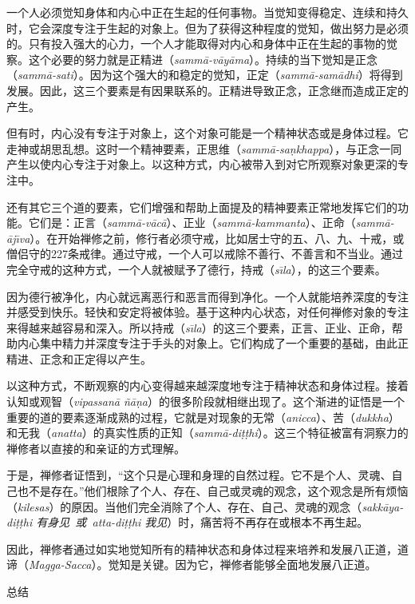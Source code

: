 一个人必须觉知身体和内心中正在生起的任何事物。当觉知变得稳定、连续和持久时，它会深度专注于生起的对象上。但为了获得这种程度的觉知，做出努力是必须的。只有投入强大的心力，一个人才能取得对内心和身体中正在生起的事物的觉察。这个必要的努力就是正精进（{\it samm\=a-v\=ay\=ama}）。持续的当下觉知是正念（{\it samm\=a-sati}）。因为这个强大的和稳定的觉知，正定（{\it samm\=a-sam\=adhi}）将得到发展。因此，这三个要素是有因果联系的。正精进导致正念，正念继而造成正定的产生。

但有时，内心没有专注于对象上，这个对象可能是一个精神状态或是身体过程。它走神或胡思乱想。这时一个精神要素，正思维（{\it samm\=a-sa\d nkhappa}），与正念一同产生以使内心专注于对象上。以这种方式，内心被带入到对它所观察对象更深的专注中。

还有其它三个道的要素，它们增强和帮助上面提及的精神要素正常地发挥它们的功能。它们是：正言（{\it samm\=a-v\=ac\=a}）、正\1业（{\it samm\=a-kammanta}）、正命（{\it samm\=a-\=aj\=\i va}）。在开始禅修之前，修行者必须守戒，比如居士守的五、八、九、十戒，或僧侣守的227条戒律。通过守戒，一个人可以戒除不善行、不善言和不当业。通过完全守戒的这种方式，一个人就被赋予了德行，持戒（{\it s\=\i la}），的这三个要素。

因为德行被净化，内心就远离恶行和恶言而得到净化。一个人就能培养深度的专注并感受到快乐。轻快和安定将被体验。基于这种内心状态，对任何禅修对象的专注来得越来越容易和深入。所以持戒（{\it s\=\i la}）的这三个要素，正言、正业、正命，帮助内心集中精力并深度专注于手头的对象上。它们构成了一个重要的基础，由此正精进、正念和正定得以产生。

以这种方式，不断观察的内心变得越来越深度地专注于精神状态和身体过程。接着认知或观智（{\it vipassan\=a \~n\=a\d na}）的很多阶段就相继出现了。这个渐进的证悟是一个重要的道的要素逐渐成熟的过程，它就是对现象的无常（{\it anicca}）、苦（{\it dukkha}）和无我（{\it anatta}）的真实性质的正知（{\it samm\=a-di\d t\d thi}）。这三个特征被富有洞察力的禅修者以直接的和亲证的方式理解。

于是，禅修者证悟到，“这个只是心理和身理的自然过程。它不是个人、灵魂、自己也不是存在。”他们根除了\1个人、存在、自己或灵魂的观念，这个观念是所有烦恼（{\it kilesas}）的原因。当他们完全消除了个人、存在、自己、灵魂的观念（{\it sakk\=aya-di\d t\d thi 有身见\ 或\ atta-di\d t\d thi 我见}）时，痛苦将不再存在或根本不再生起。

因此，禅修者通过如实地觉知所有的精神状态和身体过程来培养和发展八正道，道谛（{\it Magga-Sacca}）。觉知是关键。因为它，禅修者能够全面地发展八正道。

\sssubsectnonb 总结


